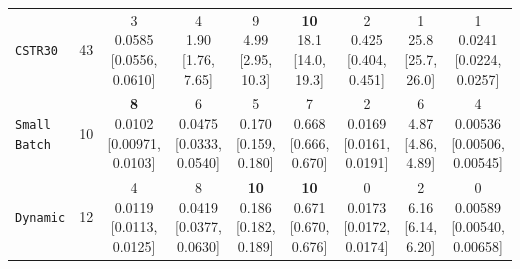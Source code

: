 \begin{tabular}{@{}lrccccccc@{}}
\texttt{CSTR30} & 43 & \makecell{3\\0.0585\\{[0.0556, 0.0610]}} & \makecell{4\\1.90\\{[1.76, 7.65]}} & \makecell{9\\4.99\\{[2.95, 10.3]}} & \makecell{\textbf{10}\\18.1\\{[14.0, 19.3]}} & \makecell{2\\0.425\\{[0.404, 0.451]}} & \makecell{1\\25.8\\{[25.7, 26.0]}} & \makecell{1\\0.0241\\{[0.0224, 0.0257]}} \\
\texttt{Small Batch} & 10 & \makecell{\textbf{8}\\0.0102\\{[0.00971, 0.0103]}} & \makecell{6\\0.0475\\{[0.0333, 0.0540]}} & \makecell{5\\0.170\\{[0.159, 0.180]}} & \makecell{7\\0.668\\{[0.666, 0.670]}} & \makecell{2\\0.0169\\{[0.0161, 0.0191]}} & \makecell{6\\4.87\\{[4.86, 4.89]}} & \makecell{4\\0.00536\\{[0.00506, 0.00545]}} \\
\texttt{Dynamic} & 12 & \makecell{4\\0.0119\\{[0.0113, 0.0125]}} & \makecell{8\\0.0419\\{[0.0377, 0.0630]}} & \makecell{\textbf{10}\\0.186\\{[0.182, 0.189]}} & \makecell{\textbf{10}\\0.671\\{[0.670, 0.676]}} & \makecell{0\\0.0173\\{[0.0172, 0.0174]}} & \makecell{2\\6.16\\{[6.14, 6.20]}} & \makecell{0\\0.00589\\{[0.00540, 0.00658]}} \\

\end{tabular}
